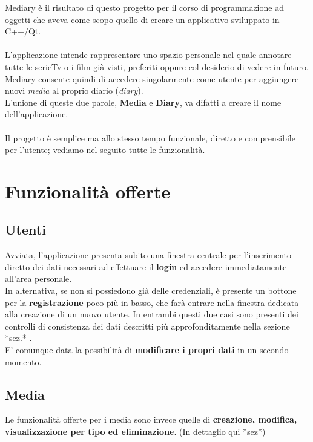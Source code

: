 \documentclass[10pt,a4paper,openany]{article}
\begin{document}
Mediary è il risultato di questo progetto per il corso di programmazione ad oggetti che aveva come scopo quello di creare un applicativo sviluppato in C++/Qt.\\\\
L'applicazione intende rappresentare uno spazio personale nel quale annotare tutte le serieTv o i film già visti, preferiti oppure col desiderio di vedere in futuro.\\
Mediary consente quindi di accedere singolarmente come utente per aggiungere nuovi \textit{media} al proprio diario (\textit{diary}).\\
L'unione di queste due parole, \textbf{Media} e \textbf{Diary}, va difatti a creare il nome dell'applicazione.\\\\
Il progetto è semplice ma allo stesso tempo funzionale, diretto e comprensibile per l'utente; vediamo nel seguito tutte le funzionalità.\vspace{20pt}



\section{Funzionalità offerte}
	\subsection{Utenti}

	Avviata, l'applicazione presenta subito una finestra centrale per l'inserimento diretto dei dati necessari ad effettuare il 				\textbf{login} ed accedere  immediatamente all'area personale.\\
	In alternativa, se non si possiedono già delle credenziali, è presente un bottone per la \textbf{registrazione} poco più in basso, che 		farà entrare nella finestra dedicata alla creazione di un nuovo utente.
	In entrambi questi due casi sono presenti dei controlli di consistenza dei dati descritti più approfonditamente nella sezione *sez.* .\\
	E' comunque data la possibilità di \textbf{modificare i propri dati} in un secondo momento.
		
	\subsection{Media}
	
	Le funzionalità offerte per i media sono invece quelle di \textbf{creazione, modifica, visualizzazione per tipo ed eliminazione}. (In 
	dettaglio qui *sez*)\vspace{20pt}
	
\end{document}
